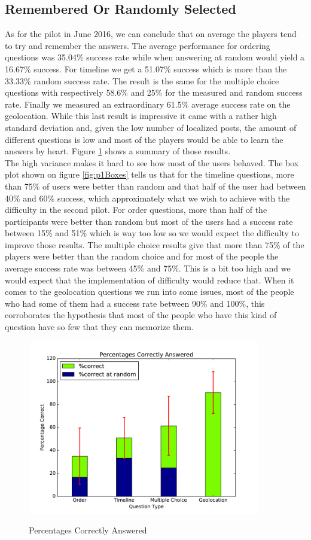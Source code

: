 \subsection{Remembered Or Randomly Selected}
As for the pilot in June 2016, we can conclude that on average the players tend to try and remember the answers. The average performance for ordering questions was 35.04\% success rate while when answering at random would yield a 16.67\% success. For timeline we get a 51.07\% success which is more than the 33.33\% random success rate. The result is the same for the multiple choice questions with respectively 58.6\% and 25\% for the measured and random success rate. Finally we measured an extraordinary 61.5\% average success rate on the geolocation. While this last result is impressive it came with a rather high standard deviation and, given the low number of localized posts, the amount of different questions is low and most of the players would be able to learn the answers by heart. Figure \ref{fig:p1Correct} shows a summary of those results.\\
The high variance makes it hard to see how most of the users behaved. The box plot shown on figure \ref{fig:p1Boxes} tells us that for the timeline questions, more than 75\% of users were better than random and that half of the user had between 40\% and 60\% success, which approximately what we wish to achieve with the difficulty in the second pilot. For order questions, more than half of the participants were better than random but most of the users had a success rate between 15\% and 51\% which is way too low so we would expect the difficulty to improve those results. The multiple choice results give that more than 75\% of the players were better than the random choice and for most of the people the average success rate was between 45\% and 75\%. This is a bit too high and we would expect that the implementation of difficulty would reduce that. When it comes to the geolocation questions we run into some issues, most of the people who had some of them had a success rate between 90\% and 100\%, this corroborates the hypothesis that most of the people who have this kind of question have so few that they can memorize them.
\begin{figure}
\centering
{\includegraphics[width=4in]{images/pilot_1_correct.pdf}}
\caption{Percentages Correctly Answered}
\label{fig:p1Correct}
\end{figure}
